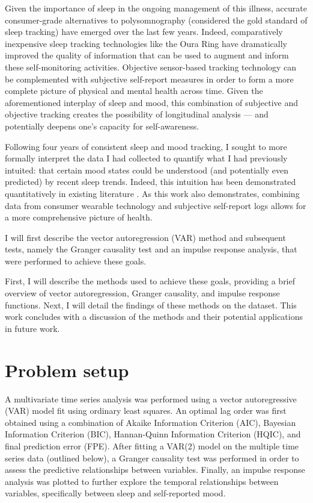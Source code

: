 \documentclass[9pt]{article}
\begin{document}
Given the importance of sleep in the ongoing management of this illness,
accurate consumer-grade alternatives to polysomnography (considered the gold
standard of sleep tracking) have emerged over the last few years. Indeed,
comparatively inexpensive sleep tracking technologies like the Oura Ring have
dramatically improved the quality of information that can be used to augment
and inform these self-monitoring activities. Objective sensor-based tracking
technology can be complemented with subjective self-report measures in order to
form a more complete picture of physical and mental health across time. Given
the aforementioned interplay of sleep and mood, this combination of subjective
and objective tracking creates the possibility of longitudinal analysis --- and
potentially deepens one's capacity for self-awareness.

Following four years of consistent sleep and mood tracking, I sought to more
formally interpret the data I had collected to quantify what I had previously
intuited: that certain mood states could be understood (and potentially even
predicted) by recent sleep trends. Indeed, this intuition has been demonstrated
quantitatively in existing literature \citep{boseVector2017,
moshePredicting2021, jafarlouObjective2023}. As this work also demonstrates,
combining data from consumer wearable technology and subjective self-report
logs allows for a more comprehensive picture of health.

I will first describe the vector autoregression (VAR) method and subsequent
tests, namely the Granger causality test and an impulse response analysis, that
were performed to achieve these goals.

First, I will describe the methods used to achieve these goals, providing a
brief overview of vector autoregression, Granger causality, and impulse
response functions. Next, I will detail the findings of these methods on the
dataset. This work concludes with a discussion of the methods and their
potential applications in future work.

\section{Problem setup}\label{methods}

A multivariate time series analysis was performed using a vector autoregressive
(VAR) model fit using ordinary least squares. An optimal lag order was first
obtained using a combination of Akaike Information Criterion (AIC), Bayesian
Information Criterion (BIC), Hannan-Quinn Information Criterion (HQIC), and
final prediction error (FPE). After fitting a VAR(2) model on the multiple time
series data (outlined below), a Granger causality test was performed in order
to assess the predictive relationships between variables. Finally, an impulse
response analysis was plotted to further explore the temporal relationships
between variables, specifically between sleep and self-reported mood.
\end{document}
